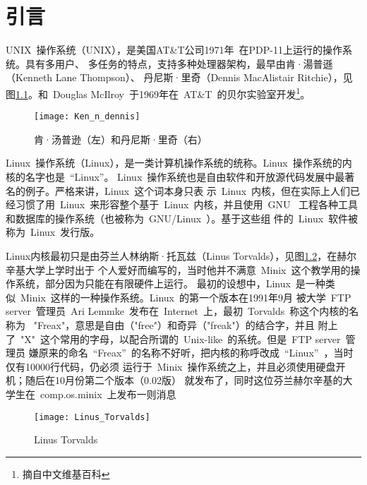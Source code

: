 \chapter{引言}
\label{cha:intro}
UNIX~操作系统（UNIX），是美国AT\&T公司1971年~在PDP-11上运行的操作系统。具有多用户、
多任务的特点，支持多种处理器架构，最早由肯·湯普遜（Kenneth Lane Thompson）、
丹尼斯·里奇（Dennis MacAlistair Ritchie），见图\ref{fig:ken}。和~Douglas
McIlroy~于1969年在~AT\&T~的贝尔实验室开发\footnote{摘自中文维基百科}。\par
\begin{figure}[htbp]
    \centering
	\texttt{[image: Ken\_n\_dennis]}
    \caption{肯·汤普逊（左）和丹尼斯·里奇（右）}
    \label{fig:ken}
\end{figure}
Linux~操作系统（Linux），是一类计算机操作系统的统称。Linux~操作系统的内核的名字也是~“Linux”。
Linux~操作系统也是自由软件和开放源代码发展中最著名的例子。严格来讲，Linux~这个词本身只表
示~Linux~内核，但在实际上人们已经习惯了用~Linux~来形容整个基于~Linux~内核，并且使用~GNU~
工程各种工具和数据库的操作系统（也被称为~GNU/Linux~）。基于这些组
件的~Linux~软件被称为~Linux~发行版。

Linux内核最初只是由芬兰人林纳斯·托瓦兹（Linus
Torvalds），见图\ref{fig:linus}，在赫尔辛基大学上学时出于
个人爱好而编写的，当时他并不满意~Minix~这个教学用的操作系统，部分因为只能在有限硬件上运行。
最初的设想中，Linux~是一种类似~Minix~这样的一种操作系统。Linux~的第一个版本在1991年9月
被大学~FTP server~管理员~Ari Lemmke~发布在~Internet~上，最初~Torvalds~称这个内核的名称为
~"Freax"，意思是自由（"free"）和奇异（"freak"）的结合字，并且
附上了~"X"~这个常用的字母，以配合所谓的~Unix-like~的系统。但是~FTP server~管理员
嫌原来的命名~“Freax”~的名称不好听，把内核的称呼改成~“Linux”~，当时仅有10000行代码，仍必须
运行于~Minix~操作系统之上，并且必须使用硬盘开机；随后在10月份第二个版本（0.02版）
就发布了，同时这位芬兰赫尔辛基的大学生在~comp.os.minix~上发布一则消息\par
\begin{center}
\end{center}
\begin{figure}[htbp]
    \centering
    \texttt{[image: Linus\_Torvalds]}
    \caption{Linus Torvalds}
    \label{fig:linus}
\end{figure}

